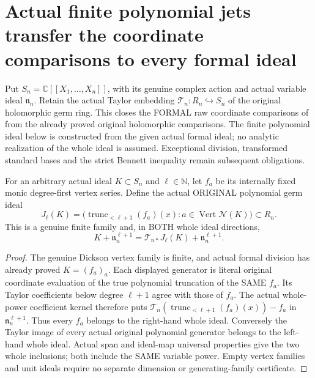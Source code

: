 \section{Actual finite polynomial jets transfer the coordinate comparisons to every formal ideal}

Put $S_n=\mathbb C[[X_1,\ldots,X_n]]$, with its genuine complex action
and actual variable ideal $\mathfrak n_n$. Retain the actual Taylor
embedding $\mathcal T_n:R_n\hookrightarrow S_n$ of the original
holomorphic germ ring. This closes the FORMAL raw coordinate comparisons
of \cite[Lemmas~7.25--7.26, p.~270]{bierstone-milman97-invent-math}
from the already proved original holomorphic comparisons. The finite
polynomial ideal below is constructed from the given actual formal ideal;
no analytic realization of the whole ideal is assumed. Exceptional
division, transformed standard bases and the strict Bennett inequality
remain subsequent obligations.

\begin{lemma}
\label{hir:actual-formal-polynomial-jet-whole-thickening}
For an arbitrary actual ideal $K\subset S_n$ and $\ell\in\mathbb N$,
let $f_a$ be its internally fixed monic degree-first vertex series.
Define the actual ORIGINAL polynomial germ ideal
\[
 J_\ell(K)=\bigl(\operatorname{trunc}_{<\ell+1}(f_a)(x):
                 a\in\operatorname{Vert}\mathcal N(K)\bigr)\subset R_n.
\]
This is a genuine finite family and, in BOTH whole ideal directions,
\[
 K+\mathfrak n_n^{\ell+1}
 =\mathcal T_{n*}J_\ell(K)+\mathfrak n_n^{\ell+1}.
\]
\leanok
\end{lemma}
\begin{proof}
The genuine Dickson vertex family is finite, and actual formal division
has already proved $K=(f_a)_a$. Each displayed generator is literal
original coordinate evaluation of the true polynomial truncation of the
SAME $f_a$. Its Taylor coefficients below degree $\ell+1$ agree with
those of $f_a$. The actual whole-power coefficient kernel therefore puts
$\mathcal T_n(\operatorname{trunc}_{<\ell+1}(f_a)(x))-f_a$ in
$\mathfrak n_n^{\ell+1}$. Thus every $f_a$ belongs to the right-hand
whole ideal. Conversely the Taylor image of every actual original
polynomial generator belongs to the left-hand whole ideal. Actual span
and ideal-map universal properties give the two whole inclusions; both
include the SAME variable power. Empty vertex families and unit ideals
require no separate dimension or generating-family certificate.
\end{proof}

